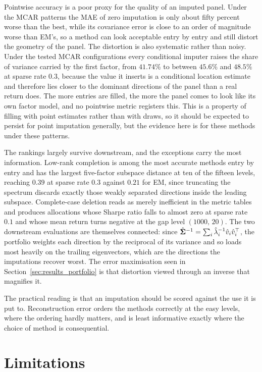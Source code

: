 Pointwise accuracy is a poor proxy for the quality of an imputed panel. Under
the MCAR patterns the MAE of zero imputation is only about fifty percent worse
than the best, while its covariance error is close to an order of magnitude
worse than EM's, so a method can look acceptable entry by entry and still
distort the geometry of the panel. The distortion is also systematic rather than
noisy. Under the tested MCAR configurations every conditional imputer raises the
share of variance carried by the first factor, from $41.74\%$ to between $45.6\%$
and $48.5\%$ at sparse rate $0.3$, because the value it inserts is a conditional
location estimate and therefore lies closer to the dominant directions of the
panel than a real return does. The more entries are filled, the more the panel
comes to look like its own factor model, and no pointwise metric registers this.
This is a property of filling with point estimates rather than with draws, so it
should be expected to persist for point imputation generally, but the evidence
here is for these methods under these patterns.

The rankings largely survive downstream, and the exceptions carry the most
information. Low-rank completion is among the most accurate methods entry by
entry and has the largest five-factor subspace distance at ten of the fifteen
levels, reaching $0.39$ at sparse rate $0.3$ against $0.21$ for EM, since
truncating the spectrum discards exactly those weakly separated directions inside
the leading subspace.
Complete-case deletion reads as merely inefficient in the metric tables and
produces allocations whose Sharpe ratio falls to almost zero at sparse rate
$0.1$ and whose mean return turns negative at the gap level $(1000,\,20)$. The
two downstream evaluations are themselves connected: since
$\hat{\boldsymbol{\Sigma}}^{-1} = \sum_i \hat\lambda_i^{-1} \hat v_i \hat v_i^\top$, the
portfolio weights each direction by the reciprocal of its variance and so loads
most heavily on the trailing eigenvectors, which are the directions the
imputations recover worst. The error maximisation seen in
Section~\ref{sec:results_portfolio} is that distortion viewed through an inverse
that magnifies it.

The practical reading is that an imputation should be scored against the use it
is put to. Reconstruction error orders the methods correctly at the easy levels,
where the ordering hardly matters, and is least informative exactly where the
choice of method is consequential.

\section{Limitations}

